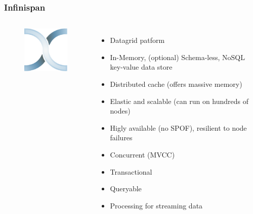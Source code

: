 \documentclass[10pt,utf8]{beamer}
\begin{document}
\begin{frame}
	\frametitle{Infinispan}
	\begin{columns}
		\begin{figure}
			\centering
			\includegraphics[width=3cm]{./img/infinispan.eps}
		\end{figure}
		\begin{itemize}
			\item Datagrid patform
			\item In-Memory, (optional) Schema-less, NoSQL key-value data store
			\item Distributed cache (offers massive memory)
			\item Elastic and scalable (can run on hundreds of nodes)
			\item Higly available (no SPOF), resilient to node failures
			\item Concurrent (MVCC)
			\item Transactional
			\item Queryable
			\item Processing for streaming data
		\end{itemize}
	\end{columns}
\end{frame}
\end{document}
